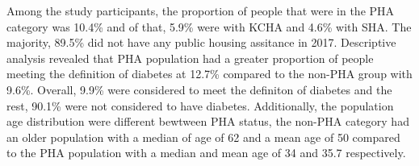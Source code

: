 \documentclass [11pt, proquest] {uwthesis}[2015/03/03]
\begin{document}
Among the study participants, the proportion of people that were in the
PHA category was 10.4\% and of that, 5.9\% were with KCHA and 4.6\% with
SHA. The majority, 89.5\% did not have any public housing assitance in
2017. Descriptive analysis revealed that PHA population had a greater
proportion of people meeting the definition of diabetes at 12.7\%
compared to the non-PHA group with 9.6\%. Overall, 9.9\% were considered
to meet the definiton of diabetes and the rest, 90.1\% were not
considered to have diabetes. Additionally, the population age
distribution were different bewtween PHA status, the non-PHA category
had an older population with a median of age of 62 and a mean age of 50
compared to the PHA population with a median and mean age of 34 and 35.7
respectively.
\begin{table}
  

\end{table}
\end{document}
